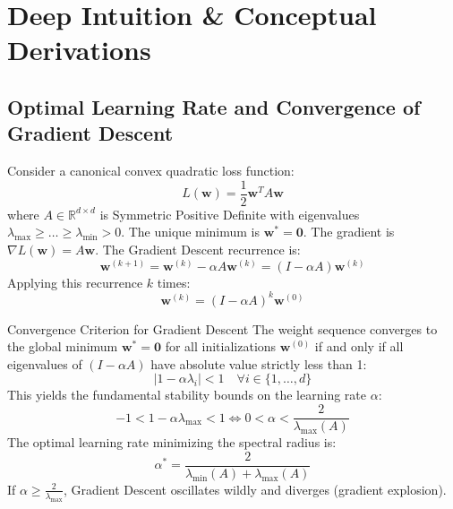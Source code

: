 \section{Deep Intuition \& Conceptual Derivations}

\subsection{Optimal Learning Rate and Convergence of Gradient Descent}

Consider a canonical convex quadratic loss function:
\begin{equation}
L(\mathbf{w}) = \frac{1}{2} \mathbf{w}^T A \mathbf{w}
\end{equation}
where $A \in \mathbb{R}^{d \times d}$ is Symmetric Positive Definite with eigenvalues $\lambda_{\max} \ge \dots \ge \lambda_{\min} > 0$. The unique minimum is $\mathbf{w}^* = \mathbf{0}$.
The gradient is $\nabla L(\mathbf{w}) = A \mathbf{w}$. The Gradient Descent recurrence is:
\begin{equation}
\mathbf{w}^{(k+1)} = \mathbf{w}^{(k)} - \alpha A \mathbf{w}^{(k)} = (I - \alpha A) \mathbf{w}^{(k)}
\end{equation}
Applying this recurrence $k$ times:
\begin{equation}
\mathbf{w}^{(k)} = (I - \alpha A)^k \mathbf{w}^{(0)}
\end{equation}

\begin{theorembox}{Convergence Criterion for Gradient Descent}
The weight sequence converges to the global minimum $\mathbf{w}^* = \mathbf{0}$ for all initializations $\mathbf{w}^{(0)}$ if and only if all eigenvalues of $(I - \alpha A)$ have absolute value strictly less than 1:
\begin{equation}
|1 - \alpha \lambda_i| < 1 \quad \forall i \in \{1, \dots, d\}
\end{equation}
This yields the fundamental stability bounds on the learning rate $\alpha$:
\begin{equation}
-1 < 1 - \alpha \lambda_{\max} < 1 \iff 0 < \alpha < \frac{2}{\lambda_{\max}(A)}
\end{equation}
The optimal learning rate minimizing the spectral radius is:
\begin{equation}
\alpha^* = \frac{2}{\lambda_{\min}(A) + \lambda_{\max}(A)}
\end{equation}
If $\alpha \ge \frac{2}{\lambda_{\max}}$, Gradient Descent oscillates wildly and diverges (gradient explosion).
\end{theorembox}

